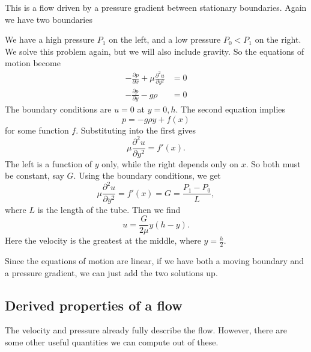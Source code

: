 \documentclass[a4paper]{article}
\begin{document}
\begin{eg}
  This is a flow driven by a pressure gradient between stationary boundaries. Again we have two boundaries
  \begin{center}
  \end{center}
  We have a high pressure $P_1$ on the left, and a low pressure $P_0 < P_1$ on the right. We solve this problem again, but we will also include gravity. So the equations of motion become
  \begin{align*}
    -\frac{\partial p}{\partial x} + \mu\frac{\partial^2 u}{\partial y^2} &= 0\\
    -\frac{\partial p}{\partial y} - g\rho &= 0
  \end{align*}
  The boundary conditions are $u = 0$ at $y = 0, h$. The second equation implies
  \[
    p =- g\rho y + f(x)
  \]
  for some function $f$. Substituting into the first gives
  \[
    \mu\frac{\partial^2 u}{\partial y^2} = f'(x).
  \]
  The left is a function of $y$ only, while the right depends only on $x$. So both must be constant, say $G$. Using the boundary conditions, we get
  \[
    \mu\frac{\partial^2 u}{\partial y^2} = f'(x) = G = \frac{P_1 - P_0}{L},
  \]
  where $L$ is the length of the tube. Then we find
  \[
    u = \frac{G}{2 \mu} y(h - y).
  \]
  Here the velocity is the greatest at the middle, where $y = \frac{h}{2}$.
\end{eg}

Since the equations of motion are linear, if we have both a moving boundary and a pressure gradient, we can just add the two solutions up.

\subsection{Derived properties of a flow}
The velocity and pressure already fully describe the flow. However, there are some other useful quantities we can compute out of these.
\end{document}
